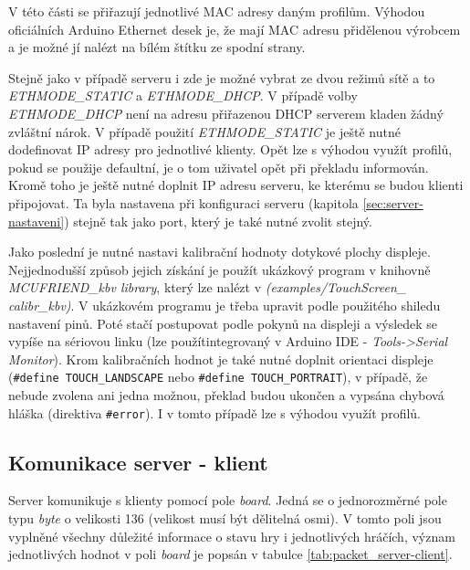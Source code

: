 V této části se přiřazují jednotlivé MAC adresy daným profilům. Výhodou oficiálních Arduino Ethernet desek je, že mají MAC adresu přidělenou výrobcem a je možné jí nalézt na bílém štítku ze spodní strany.


Stejně jako v případě serveru i zde je možné vybrat ze dvou režimů sítě a to \textit{ETHMODE\_STATIC} a \textit{ETHMODE\_DHCP}. V případě volby \textit{ETHMODE\_DHCP} není na adresu přiřazenou DHCP serverem kladen žádný zvláštní nárok. V případě použití \textit{ETHMODE\_STATIC} je ještě nutné dodefinovat IP adresy pro jednotlivé klienty. Opět lze s výhodou využít profilů, pokud se použije defaultní, je o tom uživatel opět při překladu informován.
Kromě toho je ještě nutné doplnit IP adresu serveru, ke kterému se budou klienti připojovat. Ta byla nastavena při konfiguraci serveru (kapitola \ref{sec:server-nastaveni}) stejně tak jako port, který je také nutné zvolit stejný.


Jako poslední je nutné nastavi kalibrační hodnoty dotykové plochy displeje. Nejjednodušší způsob jejich získání je použít ukázkový program v knihovně \textit{MCUFRIEND\_kbv library}, který lze nalézt  v \textit{(examples/TouchScreen\_
calibr\_kbv)}. V ukázkovém programu je třeba upravit podle použitého shiledu nastavení pinů. Poté stačí postupovat podle pokynů na displeji a výsledek se vypíše na sériovou linku (lze použítintegrovaný v Arduino IDE - \textit{Tools->Serial Monitor}). Krom kalibračních hodnot je také nutné doplnit orientaci displeje (\texttt{\#define TOUCH\_LANDSCAPE} nebo \texttt{\#define TOUCH\_PORTRAIT}), v případě, že nebude zvolena ani jedna možnou, překlad budou ukončen a vypsána chybová hláška (direktiva \texttt{\#error}). I v tomto případě lze s výhodou využít profilů.


\subsection{Komunikace server - klient}
\label{sec:comm_server-client}
Server komunikuje s klienty pomocí pole \textit{board}. Jedná se o jednorozměrné pole typu \textit{byte} o velikosti 136 (velikost musí být dělitelná osmi). V tomto poli jsou vyplněné všechny důležité informace o stavu hry i jednotlivých hráčích, význam jednotlivých hodnot v poli \textit{board} je popsán v tabulce \ref{tab:packet_server-client}.

